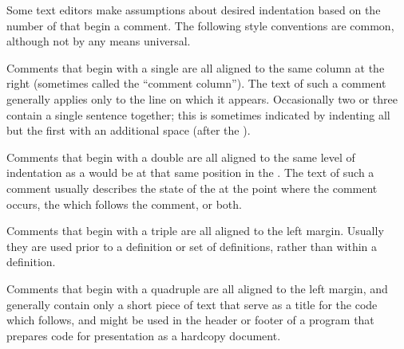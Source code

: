Some text editors make assumptions about desired indentation based on
the number of  that begin a comment.  The following style 
conventions are common, although not by any means universal.  



Comments that begin with a single  are all aligned to 
the same column at the right (sometimes called the ``comment column'').
The text of such a comment generally applies only to the line on which it appears.
Occasionally two or three contain a single sentence together;
this is sometimes indicated by indenting all but the first with an additional
space (after the ).

\endsubsubsubsection%



Comments that begin with a double  are all aligned to
the same level of indentation as a  would be at that same
position in the .
The text of such a comment usually describes
    the state of the  at the point where the comment occurs,
    the  which follows the comment,
 or both.

\endsubsubsubsection%



Comments that begin with a triple  are all aligned to
the left margin.  Usually they are used prior to a definition or set
of definitions, rather than within a definition.

\endsubsubsubsection%



Comments that begin with a quadruple  are all aligned to
the left margin, and generally contain only a short piece of text that
serve as a title for the code which follows, and might be used in the
header or footer of a program that prepares code for presentation as 
a hardcopy document.

